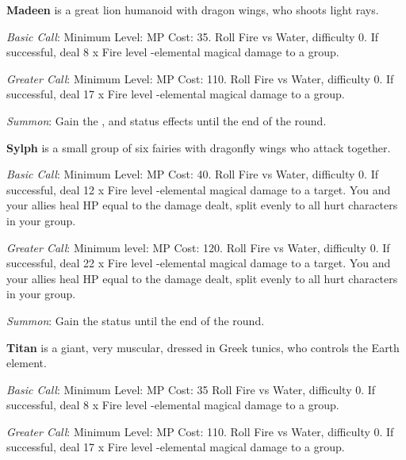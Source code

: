 \begin{multicols}{2}
    \textbf{Madeen} is a great lion humanoid with dragon wings, who shoots light rays.
    
    \textit{Basic Call}: Minimum Level:  MP Cost: 35. Roll Fire vs Water, difficulty 0. If successful, deal 8 x Fire level -elemental magical damage to a group.
    
    \textit{Greater Call}: Minimum Level:  MP Cost: 110. Roll Fire vs Water, difficulty 0. If successful, deal 17 x Fire level -elemental magical damage to a group.
    
    \textit{Summon}: Gain the  ,   and   status effects until the end of the round.

    \ffcrystal[type=level,height=8pt]
    
    \textbf{Sylph} is a small group of six fairies with dragonfly wings who attack together.
    
    \textit{Basic Call}: Minimum Level:  MP Cost: 40. Roll Fire vs Water, difficulty 0. If successful, deal 12 x Fire level -elemental magical damage to a target. You and your allies heal HP equal to the damage dealt, split evenly to all hurt characters in your group.
    
    \textit{Greater Call}: Minimum level:  MP Cost: 120. Roll Fire vs Water, difficulty 0. If successful, deal 22 x Fire level -elemental magical damage to a target. You and your allies heal HP equal to the damage dealt, split evenly to all hurt characters in your group.
    
    \textit{Summon}: Gain the  status until the end of the round.

    \ffcrystal[type=level,height=8pt]
    
    \textbf{Titan} is a giant, very muscular, dressed in Greek tunics, who controls the Earth element.
    
    \textit{Basic Call}: Minimum Level:  MP Cost: 35 Roll Fire vs Water, difficulty 0. If successful, deal 8 x Fire level -elemental magical damage to a group.
    
    \textit{Greater Call}: Minimum Level:  MP Cost: 110. Roll Fire vs Water, difficulty 0. If successful, deal 17 x Fire level -elemental magical damage to a group.
    

\end{multicols}
